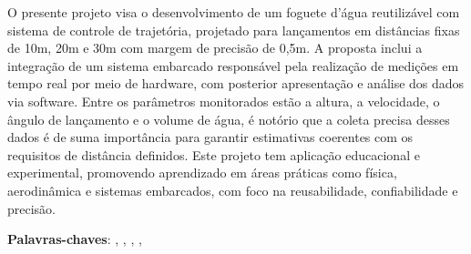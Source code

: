\begin{resumo}


\tab{1cm}O presente projeto visa o desenvolvimento de um foguete d'água reutilizável com sistema de controle de trajetória, projetado para lançamentos em distâncias fixas de 10m, 20m e 30m com margem de precisão de 0,5m. A proposta inclui a integração de um sistema embarcado responsável pela realização de medições em tempo real por meio de hardware, com posterior apresentação e análise dos dados via software. Entre os parâmetros monitorados estão a altura, a velocidade, o ângulo de lançamento e o volume de água, é notório que a coleta precisa desses dados é de suma importância para garantir estimativas coerentes com os requisitos de distância definidos. Este projeto tem aplicação educacional e experimental, promovendo aprendizado em áreas práticas como física, aerodinâmica e sistemas embarcados, com foco na reusabilidade, confiabilidade e precisão.

\vspace{\onelineskip}
\noindent
\textbf{Palavras-chaves}: {\imprimirpalavrachaveum, \imprimirpalavrachavedois, \imprimirpalavrachavetres, \imprimirpalavrachavequatro, \imprimirpalavrachavecinco}
\end{resumo}


    
